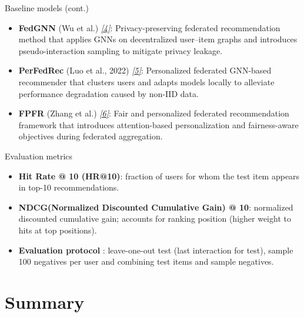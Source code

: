 \documentclass{beamer}
\begin{document}
\begin{frame}{Baseline models (cont.)}
\small
\begin{itemize}

  \item \textbf{FedGNN} (Wu et al.)
  {\color{blue}\hyperlink{ref:fedgnn}{\textit{[4]}}}:
  Privacy-preserving federated recommendation method that applies GNNs
  on decentralized user–item graphs and introduces pseudo-interaction
  sampling to mitigate privacy leakage.

  \item \textbf{PerFedRec} (Luo et al., 2022)
  {\color{blue}\hyperlink{ref:perfedrec}{\textit{[5]}}}:
  Personalized federated GNN-based recommender that clusters users and
  adapts models locally to alleviate performance degradation caused by
  non-IID data.

  \item \textbf{FPFR} (Zhang et al.)
  {\color{blue}\hyperlink{ref:fpfr}{\textit{[6]}}}:
  Fair and personalized federated recommendation framework that
  introduces attention-based personalization and fairness-aware
  objectives during federated aggregation.

\end{itemize}
\end{frame}


\begin{frame}{Evaluation metrics}
  \begin{itemize}
    \item \textbf{Hit Rate @ 10 (HR@10)}: fraction of users for whom the test item appears in top-10 recommendations.
    \item \textbf{NDCG(Normalized Discounted Cumulative Gain) @ 10}: normalized discounted cumulative gain; accounts for ranking position (higher weight to hits at top positions).
    \item \textbf{Evaluation protocol} : leave-one-out test (last interaction for test), sample 100 negatives per user and combining test items and sample negatives.
  \end{itemize}
\end{frame}

\section{Summary}
\end{document}
